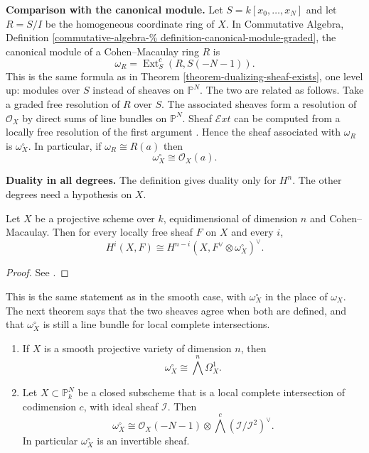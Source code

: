 \medskip\noindent
{\bf Comparison with the canonical
module.}
Let $S=k[x_0,\ldots,x_N]$ and let $R=S/I$
be the homogeneous coordinate ring of
$X$. In Commutative Algebra, Definition
\ref{commutative-algebra-%
definition-canonical-module-graded},
the canonical module of a
Cohen--Macaulay ring $R$ is
$$
\omega_R=
\operatorname{Ext}^{c}_S(R,S(-N-1)).
$$
This is the same formula as in Theorem
\ref{theorem-dualizing-sheaf-exists},
one level up: modules over $S$ instead of
sheaves on $\mathbb{P}^N$. The two are
related as follows. Take a graded free
resolution of $R$ over $S$. The
associated sheaves form a resolution of
$\mathcal{O}_X$ by direct sums of line
bundles on $\mathbb{P}^N$. Sheaf
$\mathcal{E}xt$ can be computed from a
locally free resolution of the first
argument \cite[III, Proposition 6.5]{har}.
Hence the sheaf associated with
$\omega_R$ is $\omega_X^\circ$. In
particular, if $\omega_R\cong R(a)$ then
$$
\omega_X^\circ\cong\mathcal{O}_X(a).
$$

\medskip\noindent
{\bf Duality in all degrees.}
The definition gives duality only for
$H^n$. The other degrees need a
hypothesis on $X$.

\begin{theorem}
\label{theorem-serre-duality-cohen-macaulay}
Let $X$ be a projective scheme over $k$,
equidimensional of dimension $n$ and
Cohen--Macaulay. Then for every locally
free sheaf $F$ on $X$ and every $i$,
$$
H^i(X,F)\cong
H^{n-i}(X,F^\vee\otimes\omega_X^\circ)^\vee.
$$
\end{theorem}

\begin{proof}
See \cite[III, Corollary 7.7]{har}.
\end{proof}

This is the same statement as in the
smooth case, with $\omega_X^\circ$ in the
place of $\omega_X$. The next theorem
says that the two sheaves agree when both
are defined, and that $\omega_X^\circ$ is
still a line bundle for local complete
intersections.

\begin{theorem}
\label{theorem-dualizing-sheaf-lci}
\begin{enumerate}
\item If $X$ is a smooth projective
variety of dimension $n$, then
$$
\omega_X^\circ\cong
\bigwedge^n\Omega^1_X.
$$
\item Let $X\subset\mathbb{P}^N_k$ be a
closed subscheme that is a local complete
intersection of codimension $c$, with
ideal sheaf $\mathcal{I}$. Then
$$
\omega_X^\circ\cong
\mathcal{O}_X(-N-1)\otimes
\bigwedge^c
(\mathcal{I}/\mathcal{I}^2)^\vee.
$$
In particular $\omega_X^\circ$ is an
invertible sheaf.
\end{enumerate}
\end{theorem}

